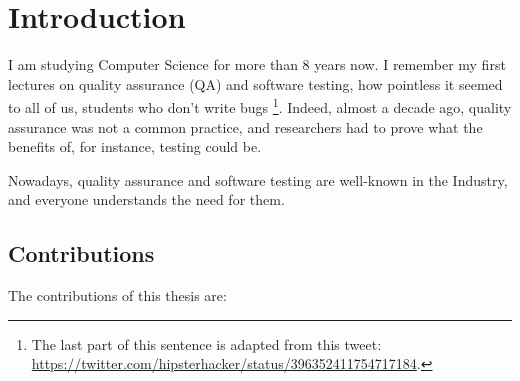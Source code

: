 %
\chapter{Introduction}
\label{sec:intro}

\minitoc

I am studying Computer Science for more than 8 years now. I
remember my first lectures on quality assurance (QA) and software
testing, how pointless it seemed to all of us, students who don't
write bugs \footnote{The last part of this sentence is adapted
from this tweet:
\url{https://twitter.com/hipsterhacker/status/396352411754717184}.}.
Indeed, almost a decade ago, quality assurance was not a common
practice, and researchers had to prove what the benefits of, for
instance, testing could be.

Nowadays, quality assurance and software testing are well-known
in the Industry, and everyone understands the need for them.



\section{Contributions}

The contributions of this thesis are:

